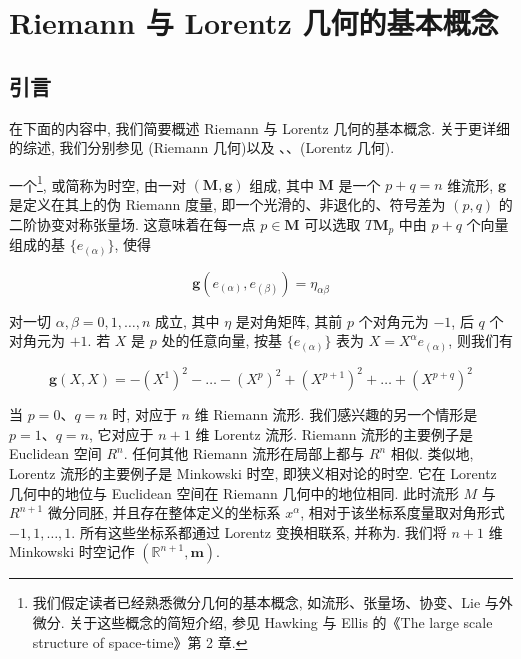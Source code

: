 \chapter{Riemann 与 Lorentz 几何的基本概念}

\section{引言}

在下面的内容中, 我们简要概述 Riemann 与 Lorentz 几何的基本概念. 关于更详细的综述, 我们分别参见 \emph{\cite{pet}}(Riemann 几何)以及 \emph{\cite{car}}、\emph{\cite{ha-e}}、\emph{\cite{wa}}(Lorentz 几何).

一个\footnote{我们假定读者已经熟悉微分几何的基本概念, 如流形、张量场、协变、Lie 与外微分. 关于这些概念的简短介绍, 参见 Hawking 与 Ellis 的《The large scale structure of space-time》第 2 章.}, 或简称为时空, 由一对 $(\mathbf{M}, \mathbf{g})$ 组成, 其中 $\mathbf{M}$ 是一个 $p+q=n$ 维流形, $\mathbf{g}$ 是定义在其上的伪 Riemann 度量, 即一个光滑的、非退化的、符号差为 $(p, q)$ 的二阶协变对称张量场. 这意味着在每一点 $p\in\mathbf{M}$ 可以选取 $T\mathbf{M}_p$ 中由 $p+q$ 个向量组成的基 $\{e_{(\alpha)}\}$, 使得

\begin{equation}
\mathbf{g}(e_{(\alpha)}, e_{(\beta)}) = \eta_{\alpha\beta}\label{eq:cA-401}
\end{equation}

对一切 $\alpha, \beta=0, 1, \ldots, n$ 成立, 其中 $\eta$ 是对角矩阵, 其前 $p$ 个对角元为 $-1$, 后 $q$ 个对角元为 $+1$. 若 $X$ 是 $p$ 处的任意向量, 按基 $\{e_{(\alpha)}\}$ 表为 $X=X^{\alpha}e_{(\alpha)}$, 则我们有

\begin{equation}
\mathbf{g}(X, X) = -(X^{1})^{2} - \dots - (X^{p})^{2} + (X^{p+1})^{2} + \dots + (X^{p+q})^{2}\label{eq:cA-402}
\end{equation}

当 $p=0$、$q=n$ 时, 对应于 $n$ 维 Riemann 流形. 我们感兴趣的另一个情形是 $p=1$、$q=n$, 它对应于 $n+1$ 维 Lorentz 流形. Riemann 流形的主要例子是 Euclidean 空间 $R^{n}$. 任何其他 Riemann 流形在局部上都与 $R^{n}$ 相似. 类似地, Lorentz 流形的主要例子是 Minkowski 时空, 即狭义相对论的时空. 它在 Lorentz 几何中的地位与 Euclidean 空间在 Riemann 几何中的地位相同. 此时流形 $M$ 与 $R^{n+1}$ 微分同胚, 并且存在整体定义的坐标系 $x^{\alpha}$, 相对于该坐标系度量取对角形式 $-1, 1, \ldots, 1$. 所有这些坐标系都通过 Lorentz 变换相联系, 并称为. 我们将 $n+1$ 维 Minkowski 时空记作 $(\mathbb{R}^{n+1}, \mathbf{m})$.

